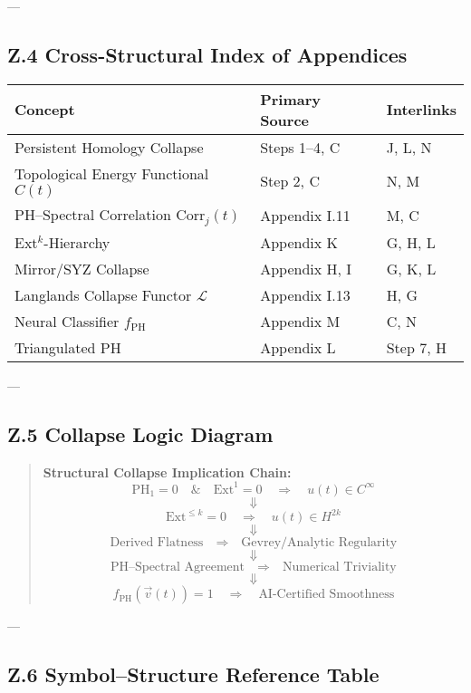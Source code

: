 \documentclass[11pt]{article}
\theoremstyle{definition}
\begin{document}
---

\subsection*{Z.4 Cross-Structural Index of Appendices}

\begin{tabular}{lll}
\textbf{Concept} & \textbf{Primary Source} & \textbf{Interlinks} \\
\hline
Persistent Homology Collapse & Steps 1–4, C & J, L, N \\
Topological Energy Functional $C(t)$ & Step 2, C & N, M \\
PH–Spectral Correlation $\mathrm{Corr}_j(t)$ & Appendix I.11 & M, C \\
Ext$^k$-Hierarchy & Appendix K & G, H, L \\
Mirror/SYZ Collapse & Appendix H, I & G, K, L \\
Langlands Collapse Functor $\mathcal{L}$ & Appendix I.13 & H, G \\
Neural Classifier $f_{\mathrm{PH}}$ & Appendix M & C, N \\
Triangulated PH & Appendix L & Step 7, H \\
\end{tabular}

---

\subsection*{Z.5 Collapse Logic Diagram}

\begin{quote}
\textbf{Structural Collapse Implication Chain:}
\[
\mathrm{PH}_1 = 0 \quad \& \quad \mathrm{Ext}^1 = 0 \quad \Rightarrow \quad u(t) \in C^\infty
\]
\[
\Downarrow
\]
\[
\mathrm{Ext}^{\leq k} = 0 \quad \Rightarrow \quad u(t) \in H^{2k}
\]
\[
\Downarrow
\]
\[
\text{Derived Flatness} \quad \Rightarrow \quad \text{Gevrey/Analytic Regularity}
\]
\[
\Downarrow
\]
\[
\text{PH–Spectral Agreement} \quad \Rightarrow \quad \text{Numerical Triviality}
\]
\[
\Downarrow
\]
\[
f_{\mathrm{PH}}(\vec{v}(t)) = 1 \quad \Rightarrow \quad \text{AI-Certified Smoothness}
\]
\end{quote}

---

\subsection*{Z.6 Symbol–Structure Reference Table}
\end{document}
